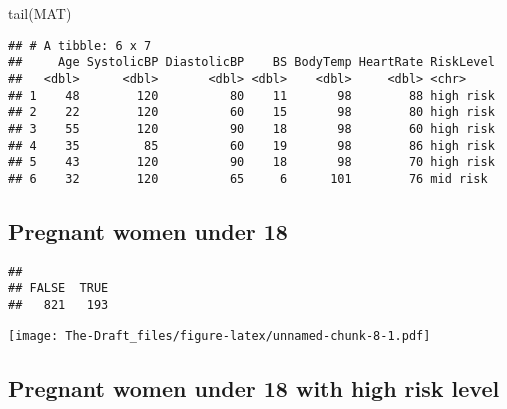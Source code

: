 \documentclass[
]{article}
\newenvironment{Shaded}{\begin{snugshade}}{\end{snugshade}}
\newcommand{\DecValTok}[1]{\textcolor[rgb]{0.00,0.00,0.81}{#1}}
\newcommand{\FunctionTok}[1]{\textcolor[rgb]{0.00,0.00,0.00}{#1}}
\newcommand{\NormalTok}[1]{#1}
\newcommand{\OtherTok}[1]{\textcolor[rgb]{0.56,0.35,0.01}{#1}}
\newcommand{\SpecialCharTok}[1]{\textcolor[rgb]{0.00,0.00,0.00}{#1}}
\begin{document}
\begin{Shaded}
\begin{Highlighting}[]
\FunctionTok{tail}\NormalTok{(MAT)}
\end{Highlighting}
\end{Shaded}

\begin{verbatim}
## # A tibble: 6 x 7
##     Age SystolicBP DiastolicBP    BS BodyTemp HeartRate RiskLevel
##   <dbl>      <dbl>       <dbl> <dbl>    <dbl>     <dbl> <chr>    
## 1    48        120          80    11       98        88 high risk
## 2    22        120          60    15       98        80 high risk
## 3    55        120          90    18       98        60 high risk
## 4    35         85          60    19       98        86 high risk
## 5    43        120          90    18       98        70 high risk
## 6    32        120          65     6      101        76 mid risk
\end{verbatim}

\hypertarget{pregnant-women-under-18}{%
\subsection{Pregnant women under 18}\label{pregnant-women-under-18}}

\begin{Shaded}
\end{Shaded}

\begin{verbatim}
## 
## FALSE  TRUE 
##   821   193
\end{verbatim}

\begin{Shaded}
\end{Shaded}

\texttt{[image: The-Draft\_files/figure-latex/unnamed-chunk-8-1.pdf]}

\hypertarget{pregnant-women-under-18-with-high-risk-level}{%
\subsection{Pregnant women under 18 with high risk
level}\label{pregnant-women-under-18-with-high-risk-level}}
\end{document}
